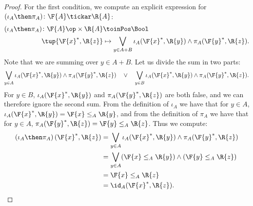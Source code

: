 \begin{proof}
    For the first condition, we compute  an explicit expression for $(\iota_A\then \pi_A) \colon \F{A} \tickar \R{A}$:
    \begin{equation}
    \begin{aligned}
        (\iota_A\then \pi_A) \colon  \F{A}\op\times \R{A} & \toinPos \Bool \\
                            \tup{\F{x}^*, \R{z}} &\mapsto
                            \bigvee_{y \in A + B} \iota_A(\F{x}^*,\R{y}) \wedge \pi_A(\F{y}^*,\R{z}).
    \end{aligned}
    \end{equation}
    Note that we are summing over $y \in A + B$. Let us divide the sum in two parts:
    \begin{equation}
    \bigvee_{y \in A} \iota_A(\F{x}^*,\R{y}) \wedge \pi_A(\F{y}^*,\R{z}) \quad\vee\quad
    \bigvee_{y \in B} \iota_A(\F{x}^*,\R{y}) \wedge \pi_A(\F{y}^*,\R{z}).
    \end{equation}
    For $y \in B$, $\iota_A(\F{x}^*,\R{y})$ and $\pi_A(\F{y}^*,\R{z})$ are both false, and we can therefore ignore the second sum.
    From the definition of $\iota_A$ we have that for $y\in A$, $ \iota_A(\F{x}^*,\R{y})=\F{x} \leq_A \R{y}$, and from the definition of $\pi_A$ we have that for $y\in A$, $\pi_A(\F{y}^*,\R{z})=\F{y} \leq_A \R{z}$. Thus we compute:
\begin{equation}
    \begin{aligned}
    \left(\iota_A\then \pi_A\right)(\F{x}^*, \R{z}) &= \bigvee_{y \in A} \iota_A(\F{x}^*,\R{y}) \wedge \pi_A(\F{y}^*,\R{z})  \\
     &= \bigvee_{y \in A} (\F{x} \leq_A \R{y}) \wedge  (\F{y} \leq_A \R{z}) \\
     &= \F{x} \leq_A \R{z}\\
     &= \id_A(\F{x}^*, \R{z}).
\end{aligned}
\end{equation}
\end{proof}

